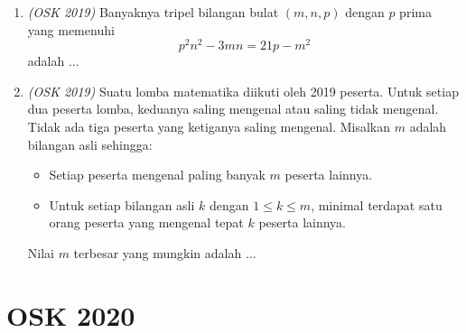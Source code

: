 \begin{enumerate}
	\item \textit{(OSK 2019)} Banyaknya tripel bilangan bulat $(m,n,p)$ dengan $p$ prima yang memenuhi
	\[
	p^2 n^2 - 3mn = 21p - m^2
	\]
	adalah $\dots$
	
	\item \textit{(OSK 2019)} Suatu lomba matematika diikuti oleh 2019 peserta.  
	Untuk setiap dua peserta lomba, keduanya saling mengenal atau saling tidak mengenal.  
	Tidak ada tiga peserta yang ketiganya saling mengenal.  
	Misalkan $m$ adalah bilangan asli sehingga:
	\begin{itemize}
		\item Setiap peserta mengenal paling banyak $m$ peserta lainnya.
		\item Untuk setiap bilangan asli $k$ dengan $1 \le k \le m$, minimal terdapat satu orang peserta yang mengenal tepat $k$ peserta lainnya.
	\end{itemize}
	Nilai $m$ terbesar yang mungkin adalah $\dots$
\end{enumerate}
\newpage
\section{OSK 2020}

